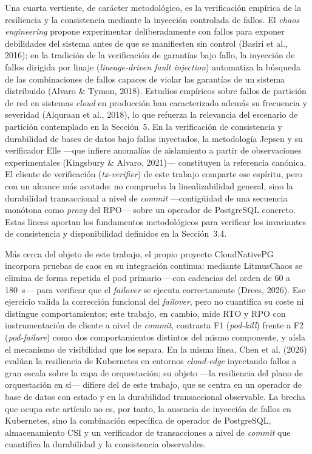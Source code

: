 \documentclass[12pt,twocolumn,letterpaper]{article}
\begin{document}
Una cuarta vertiente, de carácter metodológico, es la verificación empírica de la resiliencia y la consistencia mediante la inyección controlada de fallos. El \textit{chaos engineering} propone experimentar deliberadamente con fallos para exponer debilidades del sistema antes de que se manifiesten sin control (Basiri et al., 2016); en la tradición de la verificación de garantías bajo fallo, la inyección de fallos dirigida por linaje (\textit{lineage-driven fault injection}) automatiza la búsqueda de las combinaciones de fallos capaces de violar las garantías de un sistema distribuido (Alvaro \& Tymon, 2018). Estudios empíricos sobre fallos de partición de red en sistemas \textit{cloud} en producción han caracterizado además su frecuencia y severidad (Alquraan et al., 2018), lo que refuerza la relevancia del escenario de partición contemplado en la Sección~5. En la verificación de consistencia y durabilidad de bases de datos bajo fallos inyectados, la metodología Jepsen y su verificador Elle —que infiere anomalías de aislamiento a partir de observaciones experimentales (Kingsbury \& Alvaro, 2021)— constituyen la referencia canónica. El cliente de verificación (\textit{tx-verifier}) de este trabajo comparte ese espíritu, pero con un alcance más acotado: no comprueba la linealizabilidad general, sino la durabilidad transaccional a nivel de \textit{commit} —contigüidad de una secuencia monótona como \textit{proxy} del RPO— sobre un operador de PostgreSQL concreto. Estas líneas aportan los fundamentos metodológicos para verificar los invariantes de consistencia y disponibilidad definidos en la Sección~3.4.

Más cerca del objeto de este trabajo, el propio proyecto CloudNativePG incorpora pruebas de caos en su integración continua: mediante LitmusChaos se elimina de forma repetida el pod primario —con cadencias del orden de 60 a 180~s— para verificar que el \textit{failover} se ejecuta correctamente (Drees, 2026). Ese ejercicio valida la corrección funcional del \textit{failover}, pero no cuantifica su coste ni distingue comportamientos; este trabajo, en cambio, mide RTO y RPO con instrumentación de cliente a nivel de \textit{commit}, contrasta F1 (\textit{pod-kill}) frente a F2 (\textit{pod-failure}) como dos comportamientos distintos del mismo componente, y aísla el mecanismo de visibilidad que los separa. En la misma línea, Chen et al. (2026) evalúan la resiliencia de Kubernetes en entornos \textit{cloud-edge} inyectando fallos a gran escala sobre la capa de orquestación; su objeto —la resiliencia del plano de orquestación en sí— difiere del de este trabajo, que se centra en un operador de base de datos con estado y en la durabilidad transaccional observable. La brecha que ocupa este artículo no es, por tanto, la ausencia de inyección de fallos en Kubernetes, sino la combinación específica de operador de PostgreSQL, almacenamiento CSI y un verificador de transacciones a nivel de \textit{commit} que cuantifica la durabilidad y la consistencia observables.
\end{document}
